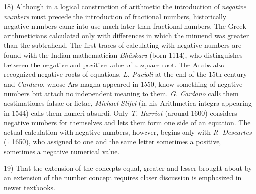 \vspace{0cm}
\leftline{\rule{2in}{0.4pt}}
\vspace{0.05cm}
{
\footnotesize
18) Although in a logical construction of arithmetic the introduction of \textit{negative numbers} must precede the introduction of fractional numbers, historically negative numbers came into use much later than fractional numbers. The Greek arithmeticians calculated only with differences in which the minuend was greater than the subtrahend. The first traces of calculating with negative numbers are found with the Indian mathematician \textit{Bhāskara} (born 1114), who distinguishes between the negative and positive value of a square root. The Arabs also recognized negative roots of equations. \textit{L. Pacioli} at the end of the 15th century and \textit{Cardano}, whose Ars magna appeared in 1550, know something of negative numbers but attach no independent meaning to them. \textit{G. Cardano} calls them aestimationes falsae or fictae, \textit{Michael Stifel} (in his Arithmetica integra appearing in 1544) calls them numeri absurdi. Only \textit{T. Harriot} (around 1600) considers negative numbers for themselves and lets them form one side of an equation. The actual calculation with negative numbers, however, begins only with \textit{R. Descartes} († 1650), who assigned to one and the same letter sometimes a positive, sometimes a negative numerical value.

19) That the extension of the concepts equal, greater and lesser brought about by an extension of the number concept requires closer discussion is emphasized in newer textbooks.

}

